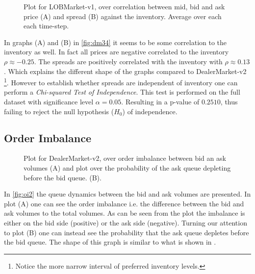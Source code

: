 \documentclass{kththesis}
\theoremstyle{definition}
\begin{document}
\begin{figure}[H]
	    	\centering
		
		\caption{Plot for LOBMarket-v1, over correlation between mid, bid and ask price (A) and spread (B) against the inventory. Average over each each time-step.}
		\label{fig:dm34}
\end{figure}
In graphs (A) and (B) in \autoref{fig:dm34} it seems to be some correlation to the inventory as well. In fact all prices are negative correlated to the inventory $\rho \approx -0.25$. The spreads are positively correlated with the inventory with $\rho\approx  0.13$. Which explains the different shape of the graphs compared to DealerMarket-v2 \footnote{Notice the more narrow interval of preferred inventory levels.}. However to establish whether spreads are independent of inventory one can perform a \textit{Chi-squared Test of Independence}. This test is performed on the full dataset with significance level $\alpha = 0.05$. Resulting in a p-value of $0.2510$, thus failing to reject the null hypothesis ($H_{0}$) of independence. 

\subsection*{Order Imbalance}

\begin{figure}[H]
	    	\centering
		
		\caption{Plot for DealerMarket-v2, over order imbalance between bid an ask volumes (A) and plot over the probability of the ask queue depleting before the bid queue. (B).}
		\label{fig:oi2}
\end{figure}
In \autoref{fig:oi2} the queue dynamics between the bid and ask volumes are presented. In plot (A) one can see the order imbalance i.e. the difference between the bid and ask volumes to the total volumes. As can be seen from the plot the imbalance is either on the bid side (positive) or the ask side (negative). Turning our attention to plot (B) one can instead see the probability that the ask queue depletes before the bid queue. The shape of this graph is similar to what is shown in \parencite{bouchaud2018trades}.
\end{document}
